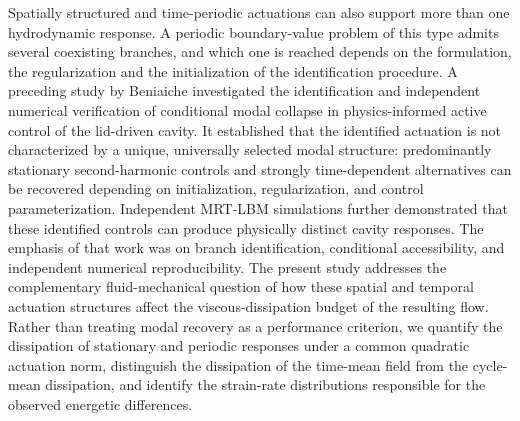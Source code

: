 \documentclass[11pt,a4paper]{article}
\newenvironment{chgdel}{\par\color{red}}{\par\color{black}}
\begin{document}
\begin{chgdel}
Spatially structured and time-periodic actuations can also support more than one
hydrodynamic response. A periodic boundary-value problem of this type admits
several coexisting branches, and which one is reached depends on the formulation,
the regularization and the initialization of the identification procedure. A
preceding study by Beniaiche  investigated the identification
and independent numerical verification of conditional modal collapse in
physics-informed active control of the lid-driven cavity. It established that the
identified actuation is not characterized by a unique, universally selected modal
structure: predominantly stationary second-harmonic controls and strongly
time-dependent alternatives can be recovered depending on initialization,
regularization, and control parameterization. Independent MRT-LBM simulations
further demonstrated that these identified controls can produce physically
distinct cavity responses. The emphasis of that work was on branch identification,
conditional accessibility, and independent numerical reproducibility. The present
study addresses the complementary fluid-mechanical question of how these spatial
and temporal actuation structures affect the viscous-dissipation budget of the
resulting flow. Rather than treating modal recovery as a performance criterion, we
quantify the dissipation of stationary and periodic responses under a common
quadratic actuation norm, distinguish the dissipation of the time-mean field from
the cycle-mean dissipation, and identify the strain-rate distributions responsible
for the observed energetic differences.
\end{chgdel}
\end{document}
